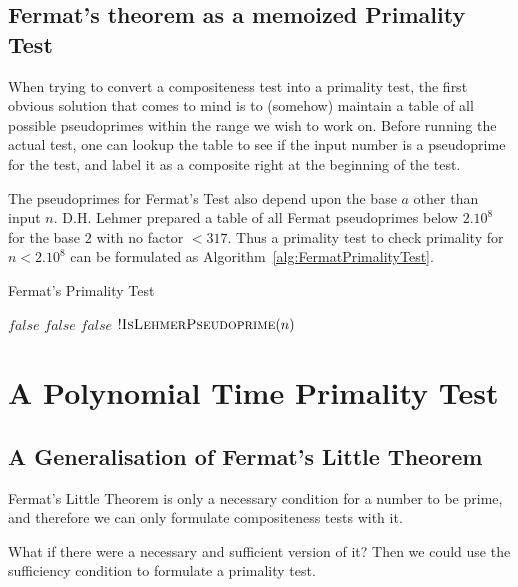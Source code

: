 \documentclass[11pt]{report}
\begin{document}
\section{Fermat's theorem as a memoized Primality Test}
When trying to convert a compositeness test into a primality test, the first obvious solution that comes to mind is to (somehow) maintain a table of all possible pseudoprimes within the range we wish to work on. Before running the actual test, one can lookup the table to see if the input number is a pseudoprime for the test, and label it as a composite right at the beginning of the test.

The pseudoprimes for Fermat's Test also depend upon the base $a$ other than input $n$. D.H. Lehmer prepared a table of all Fermat pseudoprimes below $2.10^8$ for the base $2$ with no factor $< 317$. Thus a primality test to check primality for $n < 2.10^8$ can be formulated as Algorithm~\ref{alg:FermatPrimalityTest}.

\begin{algorithm}
\caption{Fermat's Primality Test}
\label{alg:FermatPrimalityTest}
\begin{algorithmic}
	\State \Return $false$ 
\EndIf
{}
		\State \Return $false$ 
	\EndIf
\EndFor
{}
	\State \Return $false$ 
\EndIf
\State \Return $!\Call{IsLehmerPseudoprime}{n}$ 
\EndProcedure
\end{algorithmic}
\end{algorithm}

\chapter{A Polynomial Time Primality Test}

\section{A Generalisation of Fermat's Little Theorem}
Fermat's Little Theorem is only a necessary condition for a number to be prime, and therefore we can only formulate compositeness tests with it.

What if there were a necessary and sufficient version of it? Then we could use the sufficiency condition to formulate a primality test.
\end{document}
